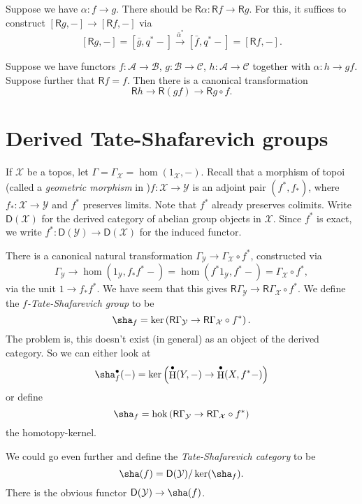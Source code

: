 \documentclass{amsart}
\DeclareMathOperator{\h}{H}
\DeclareMathOperator{\hoker}{hok}
\newcommand{\cA}{\mathcal{A}}
\newcommand{\cB}{\mathcal{B}}
\newcommand{\cC}{\mathcal{C}}
\newcommand{\cX}{\mathcal{X}}
\newcommand{\cY}{\mathcal{Y}}
\newcommand{\eD}{\mathsf{D}}
\newcommand{\eR}{\mathsf{R}}
\begin{document}
Suppose we have $\alpha:f\to g$. There should be 
$\eR \alpha:\eR f\to \eR g$. For this, it suffices to construct 
$[\eR g,-] \to [\eR f,-]$ via 
\[
  [\eR g,-] = [\bar g,q^\ast -] \xrightarrow{\bar\alpha^\ast} [\bar f,q^\ast -] = [\eR f,-] .
\]

Suppose we have functors $f:\cA\to \cB$, $g:\cB\to \cC$, 
$h:\cA\to \cC$ together with $\alpha:h\to g f$. Suppose further that $\eR f=f$. 
Then there is a canonical transformation 
\[
  \eR h \to \eR(g f) \to \eR g\circ f .
\]





\section{Derived Tate-Shafarevich groups}

If $\cX$ be a topos, let $\Gamma=\Gamma_\cX=\hom(1_\cX,-)$. Recall that a 
morphism of topoi (called a \emph{geometric morphism} in 
\cite{maclane-moerdijk-1994})$f:\cX\to \cY$ is an adjoint pair 
$(f^\ast,f_\ast)$, where $f_\ast:\cX\to \cY$ and $f^\ast$ preserves limits. Note 
that $f^\ast$ already preserves colimits. Write $\eD(\cX)$ for the derived 
category of abelian group objects in $\cX$. Since $f^\ast$ is exact, we write 
$f^\ast:\eD(\cY) \to \eD(\cX)$ for the induced functor. 

There is a canonical natural transformation 
$\Gamma_\cY \to \Gamma_\cX\circ f^\ast$, constructed via 
\[
  \Gamma_\cY \to \hom(1_\cY,f_\ast f^\ast-) = \hom(f^\ast 1_\cY,f^\ast -) = \Gamma_\cX\circ f^\ast ,
\]
via the unit $1\to f_\ast f^\ast$. We have seem that this gives 
$\eR \Gamma_\cY \to \eR \Gamma_\cX \circ f^\ast$. We define the 
\emph{$f$-Tate-Shafarevich group} to be 
\[
  \sha_f = \ker\left(\eR\Gamma_\cY \to \eR\Gamma_\cX\circ f^\ast\right) .
\]
The problem is, this doesn't exist (in general) as an object of the derived 
category. So we can either look at 
\[
  \sha_f^\bullet(-) = \ker\left(\h^\bullet(Y,-) \to \h^\bullet(X,f^\ast -)\right)
\]
or define 
\[
  \sha_f = \hoker\left(\eR\Gamma_\cY \to \eR\Gamma_\cX\circ f^\ast\right)
\]
the homotopy-kernel. 

We could go even further and define the \emph{Tate-Shafarevich category} to be 
\[
  \sha(f) = \eD(\cY) / \ker(\sha_f) .
\]
There is the obvious functor $\eD(\cY) \to \sha(f)$. 







\end{document}
